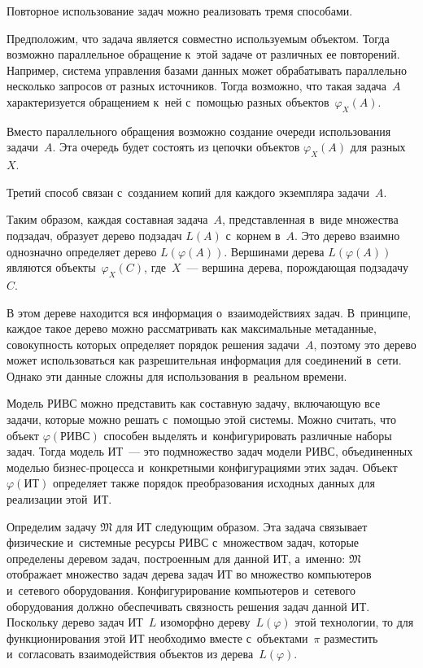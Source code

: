 \begin{multicols}{2}
  Повторное использование задач можно реализовать тремя способами. 

Предположим, что задача является со\-вмест\-но используемым объектом. Тогда 
возможно параллельное обращение к~этой задаче от различных ее повторений. 
Например, сис\-те\-ма управ\-ле\-ния базами данных 
может обрабатывать параллельно несколько запросов от разных 
источников. Тогда воз\-мож\-но, что такая задача~$A$ характеризуется обращением 
к~ней с~помощью разных объектов~$\varphi_X(A)$. 
  
  Вместо параллельного обращения возможно создание очереди использования 
задачи~$A$. Эта очередь будет со\-сто\-ять из цепочки объектов $\varphi_X(A)$ для 
разных~$X$. 
  
  Третий способ связан с~со\-зда\-ни\-ем копий для каждого экземпляра задачи~$A$. 
  
  Таким образом, каждая составная задача~$A$, пред\-став\-лен\-ная в~виде 
множества подзадач, образует дерево подзадач $L(A)$ с~корнем в~$A$. Это дерево 
взаимно однозначно определяет дерево $L(\varphi(A))$. Вершинами дерева 
$L(\varphi(A))$ являются объекты~$\varphi_X(C)$, где~$X$~--- вершина дерева, 
по\-рож\-да\-ющая подзадачу~$C$. 
  
  В этом дереве находится вся информация о~взаимодействиях задач. 
В~принципе, каждое такое дерево можно рассматривать как максимальные 
метаданные, со\-во\-куп\-ность которых определяет порядок решения задачи~$A$, 
поэтому это дерево может использоваться как разрешительная информация для 
со\-еди\-не\-ний в~сети. Однако эти данные слож\-ны для использования в~реальном 
времени. 
  
  Модель РИВС можно представить как со\-став\-ную задачу, включающую все 
задачи, которые можно решать с~по\-мощью этой сис\-те\-мы. Можно\linebreak
 считать, что 
объект $\varphi (\mathrm{РИВС})$ способен выделять и~конфигурировать 
различные наборы задач. Тогда модель ИТ~--- это подмножество задач модели 
РИВС, объединенных моделью биз\-нес-про\-цес\-са и~конкретными 
конфигурациями этих задач. Объект $\varphi (\mathrm{ИТ})$ определяет также 
порядок преобразования исходных данных для реализации этой~ИТ. 
  
  Определим задачу $\mathfrak{M}$ для ИТ сле\-ду\-ющим образом. Эта задача 
связывает физические и~сис\-тем\-ные ресурсы РИВС с~множеством задач, которые 
определены деревом задач, по\-стро\-ен\-ным для данной ИТ, а~именно: 
$\mathfrak{M}$ отоб\-ра\-жа\-ет множество задач дерева задач ИТ во мно\-же\-ст\-во 
компьютеров и~сетевого оборудования. Конфигурирование компьютеров 
и~сетевого оборудования долж\-но обеспечивать связ\-ность решения задач данной 
ИТ. Поскольку дерево задач ИТ~$L$ изоморфно дереву~$L(\varphi)$ этой 
технологии, то для функционирования этой ИТ необходимо вмес\-те 
с~объектами~$\pi$ разместить и~согласовать взаимодействия объектов из 
дерева~$L(\varphi)$. 
  

\end{multicols}
